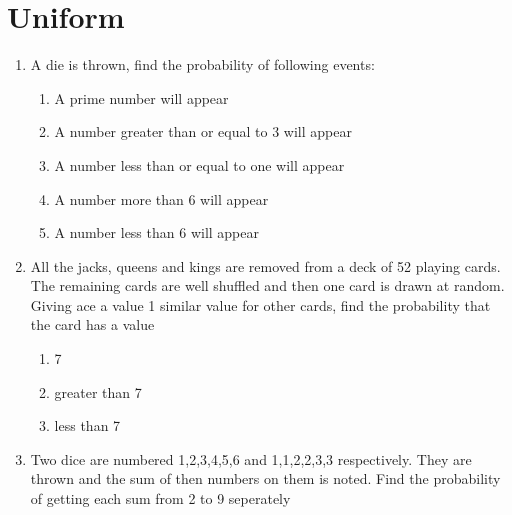     \section{Uniform}
\begin{enumerate}[label=\thesection.\arabic*,ref=\thesection.\theenumi]
\item A die is thrown, find the probability of following events:
\begin{enumerate}
\item A prime number will appear
\item A number greater than or equal to 3 will appear
\item A number less than or equal to one will appear
\item A number more than 6 will appear
\item A number less than 6 will appear
\end{enumerate}
\solution

\item All the jacks, queens and kings are removed from a deck of 52 playing cards. The remaining cards are well shuffled and then one card is drawn at random. Giving ace a value 1 similar value for other cards, find the probability that the card has a value 
\begin{enumerate}
	\item 7
	\item greater than 7
	\item less than 7
\end{enumerate}

\item Two dice are numbered 1,2,3,4,5,6 and 1,1,2,2,3,3 respectively. They are thrown and the sum of then numbers on them is noted. Find the probability of getting each sum from 2 to 9 seperately
\solution

    \end{enumerate}

